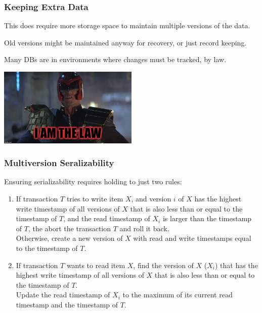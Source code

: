 \begin{frame}
\frametitle{Keeping Extra Data}
This does require more storage space to maintain multiple versions of the data. 

Old versions might be maintained anyway for recovery, or just record keeping.

Many DBs are in environments where changes must be tracked, by law.

\begin{center}
	\includegraphics[width=0.5\textwidth]{images/thelaw.jpg}
\end{center}

\end{frame}


\begin{frame}
\frametitle{Multiversion Seralizability}


Ensuring serializability requires holding to just two rules:

\begin{enumerate}
	\item If transaction $T$ tries to write item $X$, and version $i$ of $X$ has the highest write timestamp of all versions of $X$ that is also less than or equal to the timestamp of $T$, and the read timestamp of $X_{i}$ is larger than the timestamp of $T$, the abort the transaction $T$ and roll it back. \\[1em]
	
	Otherwise, create a new version of $X$ with read and write timestamps equal to the timestamp of $T$. \\[3em]
	
	\item If transaction $T$ wants to read item $X$, find the version of $X$ ($X_{i}$) that has the highest write timestamp of all versions of $X$ that is also less than or equal to the timestamp of $T$.  \\[1em]
	
	Update the read timestamp of $X_{i}$ to the maximum of its current read timestamp and the timestamp of $T$.
\end{enumerate}


\end{frame}

